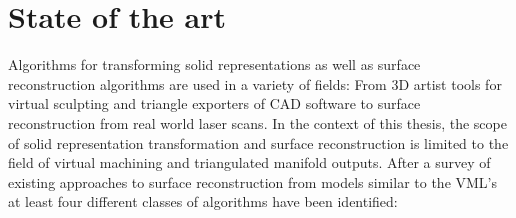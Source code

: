 
\chapter{State of the art} %
\label{ch:state_of_the_art}

Algorithms for transforming solid representations as well as surface reconstruction algorithms are used in a variety of fields:
From 3D artist tools for virtual sculpting and triangle exporters of CAD software to surface reconstruction from real world laser scans.
In the context of this thesis, the scope of solid representation transformation and surface reconstruction is limited to the field of virtual machining and triangulated manifold outputs.
After a survey of existing approaches to surface reconstruction from models similar to the VML's at least four different classes of algorithms have been identified:

